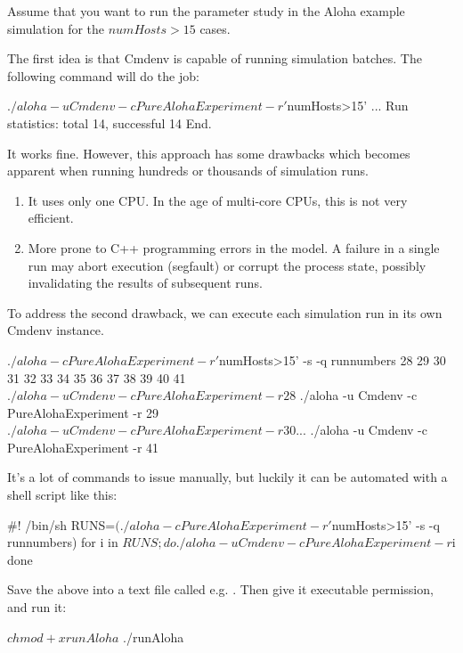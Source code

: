 Assume that you want to run the parameter study in the Aloha example
simulation for the $numHosts>15$ cases.

The first idea is that Cmdenv is capable of running simulation batches.
The following command will do the job:

\begin{commandline}
$ ./aloha -u Cmdenv -c PureAlohaExperiment -r '$numHosts>15'
...
Run statistics: total 14, successful 14
End.
\end{commandline}

It works fine. However, this approach has some drawbacks which becomes
apparent when running hundreds or thousands of simulation runs.

\begin{enumerate}
  \item It uses only one CPU. In the age of multi-core CPUs, this is not
        very efficient.
  \item More prone to C++ programming errors in the model. A failure in a single
        run may abort execution (segfault) or corrupt the process
        state, possibly invalidating the results of subsequent runs.
\end{enumerate}

To address the second drawback, we can execute each simulation run in its own
Cmdenv instance.

\begin{commandline}
$ ./aloha -c PureAlohaExperiment -r '$numHosts>15' -s -q runnumbers
28 29 30 31 32 33 34 35 36 37 38 39 40 41
$ ./aloha -u Cmdenv -c PureAlohaExperiment -r 28
$ ./aloha -u Cmdenv -c PureAlohaExperiment -r 29
$ ./aloha -u Cmdenv -c PureAlohaExperiment -r 30
...
$ ./aloha -u Cmdenv -c PureAlohaExperiment -r 41
\end{commandline}

It's a lot of commands to issue manually, but luckily it can be automated with a
shell script like this:

\begin{filelisting}
#! /bin/sh
RUNS=$(./aloha -c PureAlohaExperiment -r '$numHosts>15' -s -q runnumbers)
for i in $RUNS; do
    ./aloha -u Cmdenv -c PureAlohaExperiment -r $i
done
\end{filelisting}

Save the above into a text file called e.g. . Then give it
executable permission, and run it:

\begin{commandline}
$ chmod +x runAloha
$ ./runAloha
\end{commandline}

